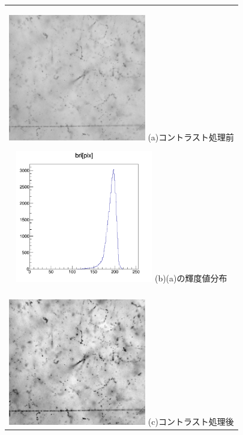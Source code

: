 \documentclass[12pt,a4paper]{jarticle}
\begin{document}
\begin{figure}[htbp]
  \centering
      \begin{tabular}{c}
        \begin{minipage}{0.5\hsize}
          \centering
            \includegraphics[clip, width=60mm]{row.png}
            \hspace{1.6cm} (a)コントラスト処理前
        \end{minipage}
        
        \begin{minipage}{0.5\hsize}
          \centering
            \includegraphics[clip, width=60mm]{row_hist.png}
            \hspace{1.6cm} (b)(a)の輝度値分布
        \end{minipage}
        \\
        \\
        \begin{minipage}{0.5\hsize}
          \centering
              \includegraphics[clip, width=60mm]{cont.png}
              \hspace{1.6cm} (c)コントラスト処理後
          \end{minipage}
          

\end{tabular}
\end{figure}
\end{document}
